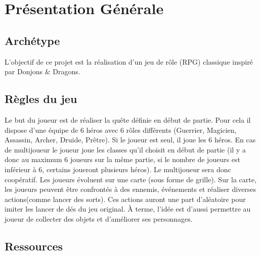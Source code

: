 \documentclass[a4paper,12pt]{article}
\begin{document}
\renewcommand{\labelitemi}{$\bullet$}

\thispagestyle{empty}



\clearpage

{\small
\tableofcontents
}



\clearpage
\section{Présentation Générale}

\subsection{Archétype}
L’objectif de ce projet est la réalisation d’un jeu de rôle (RPG) classique inspiré par Donjons \& Dragons.

\subsection{Règles du jeu}
Le but du joueur est de réaliser la quête définie en début de partie. Pour cela il dispose d'une équipe de 6 héros avec 6 rôles différents (Guerrier, Magicien, Assassin, Archer, Druide, Prêtre). Si le joueur est seul, il joue les 6 héros. En cas de multijoueur le joueur joue les classes qu'il choisit en début de partie (il y a donc au maximum 6 joueurs sur la même partie, si le nombre de joueurs est inférieur à 6, certains joueront plusieurs héros). Le multijoueur sera donc coopératif. Les joueurs évoluent sur une carte (sous forme de grille). Sur la carte, les joueurs peuvent être confrontés à des ennemis, événements et réaliser diverses actions(comme lancer des sorts). Ces actions auront une part d’aléatoire pour imiter les lancer de dés du jeu original. À terme, l’idée est d’aussi permettre au joueur de collecter des objets et d'améliorer ses personnages. 

\subsection{Ressources}
\end{document}
